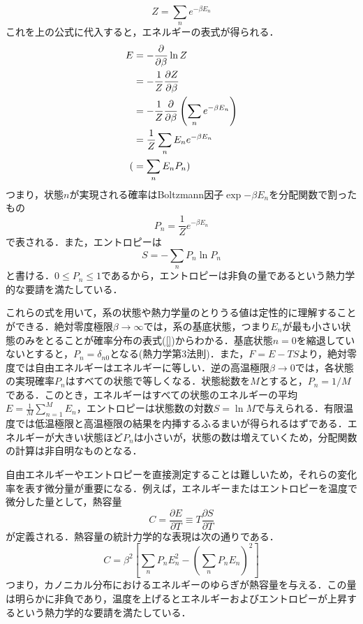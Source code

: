 \documentclass[a4paper,11pt]{jsarticle}
\begin{document}
\begin{equation}
  Z = \sum_{n} e^{-\beta E_n}
\end{equation}
これを上の公式に代入すると，エネルギーの表式が得られる．
\begin{align}
  E
    & = - \frac{\partial}{\partial \beta} \ln{Z} \notag                                            \\
    & = - \frac{1}{Z}\frac{\partial Z}{\partial \beta} \notag                                      \\
    & = - \frac{1}{Z}\frac{\partial}{\partial \beta} \left( \sum_{n} e^{-\beta E_n} \right) \notag \\
    & = \frac{1}{Z} \sum_{n} E_n e^{-\beta E_n}                                                    \\
  ( & = \sum_{n} E_n P_n) \notag                                                                   \\
\end{align}
つまり，状態$n$が実現される確率はBoltzmann因子$\exp{-\beta E_n}$を分配関数で割ったもの
\begin{equation}
  P_n = \frac{1}{Z} e^{-\beta E_n}
\end{equation}
で表される．また，エントロピーは
\begin{equation}
  S = -\sum_{n} P_n \ln{P_n}
\end{equation}
と書ける．$0 \leq P_n \leq 1$であるから，エントロピーは非負の量であるという熱力学的な要請を満たしている．\par
これらの式を用いて，系の状態や熱力学量のとりうる値は定性的に理解することができる．絶対零度極限$\beta \rightarrow \infty$では，系の基底状態，つまり$E_n$が最も小さい状態のみをとることが確率分布の表式(\ref{})からわかる．基底状態$n=0$を縮退していないとすると，$P_n=\delta_{n0}$となる(熱力学第3法則)．また，$F=E-TS$より，絶対零度では自由エネルギーはエネルギーに等しい．逆の高温極限$\beta \rightarrow 0$では，各状態の実現確率$P_n$はすべての状態で等しくなる．状態総数を$M$とすると，$P_n = 1/M$である．このとき，エネルギーはすべての状態のエネルギーの平均$E=\frac{1}{M}\sum_{n=1}^{M}E_n$，エントロピーは状態数の対数$S=\ln{M}$で与えられる．有限温度では低温極限と高温極限の結果を内挿するふるまいが得られるはずである．エネルギーが大きい状態ほど$P_n$は小さいが，状態の数は増えていくため，分配関数の計算は非自明なものとなる．\par
自由エネルギーやエントロピーを直接測定することは難しいため，それらの変化率を表す微分量が重要になる．例えば，エネルギーまたはエントロピーを温度で微分した量として，熱容量
\begin{equation}
  C = \frac{\partial E}{\partial T} \equiv T \frac{\partial S}{\partial T}
\end{equation}
が定義される．熱容量の統計力学的な表現は次の通りである．
\begin{equation}
  C = \beta^2 \left[ \sum_n P_n E_n^2 - \left( \sum_n P_n E_n \right)^2 \right]
\end{equation}
つまり，カノニカル分布におけるエネルギーのゆらぎが熱容量を与える．この量は明らかに非負であり，温度を上げるとエネルギーおよびエントロピーが上昇するという熱力学的な要請を満たしている．
\end{document}
